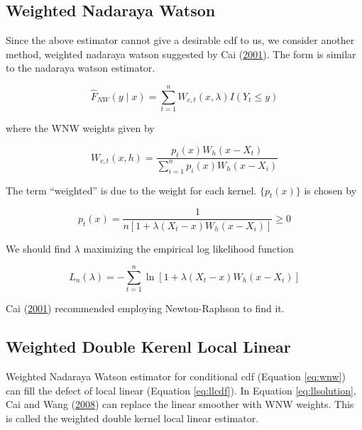 \documentclass[
]{article}
\theoremstyle{definition}
\theoremstyle{definition}
\theoremstyle{definition}
\theoremstyle{remark}
\begin{document}
\hypertarget{weighted-nadaraya-watson}{%
\subsection{Weighted Nadaraya Watson}\label{weighted-nadaraya-watson}}

Since the above estimator cannot give a desirable cdf to us, we consider another method, weighted nadaraya watson suggested by Cai (\protect\hyperlink{ref-cai2001weighted}{2001}). The form is similar to the nadaraya watson estimator.

\begin{equation}
  \hat{F}_{NW}(y \mid x)  = \sum_{t = 1}^n W_{c, t}(x, \lambda) I(Y_t \le y)
  \label{eq:wnw}
\end{equation}

where the WNW weights given by

\begin{equation}
  W_{c,t}(x, h) = \frac{p_t(x) W_h (x - X_t)}{\sum\limits_{i = 1}^n p_i(x) W_h (x - X_i)}
  \label{eq:wnwkernel}
\end{equation}

The term ``weighted'' is due to the weight for each kernel. \(\{ p_t(x) \}\) is chosen by

\begin{equation}
  p_t(x) = \frac{1}{n \left[ 1 + \lambda(X_t - x) W_h (x - X_i) \right]} \ge 0
  \label{eq:wnwpt}
\end{equation}

We should find \(\lambda\) maximizing the empirical log likelihood function

\begin{equation}
  L_n(\lambda) = - \sum_{t = 1}^n \ln \left[ 1 + \lambda(X_t - x) W_h(x - X_i) \right]
  \label{eq:emplike}
\end{equation}

Cai (\protect\hyperlink{ref-cai2001weighted}{2001}) recommended employing Newton-Raphson to find it.

\hypertarget{weighted-double-kerenl-local-linear}{%
\subsection{Weighted Double Kerenl Local Linear}\label{weighted-double-kerenl-local-linear}}

Weighted Nadaraya Watson estimator for conditional cdf (Equation \eqref{eq:wnw}) can fill the defect of local linear (Equation \eqref{eq:llcdf}). In Equation \eqref{eq:llsolution}, Cai and Wang (\protect\hyperlink{ref-cai:2008aa}{2008}) can replace the linear smoother with WNW weights. This is called the weighted double kernel local linear estimator.
\end{document}
